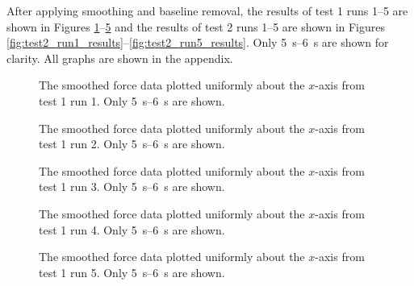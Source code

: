 \documentclass[12 pt]{report}
\begin{document}
After applying smoothing and baseline removal, the results of test \num{1} runs \numrange{1}{5} are shown in Figures \ref{fig:test1_run1_results}--\ref{fig:test1_run5_results} and the results of test \num{2} runs \numrange{1}{5} are shown in Figures \ref{fig:test2_run1_results}--\ref{fig:test2_run5_results}. Only \qtyrange{5}{6}{\second} are shown for clarity. All graphs are shown in the appendix.

\begin{figure}[htbp]
	\centering
	
	\caption{The smoothed force data plotted uniformly about the $x$-axis from test \num{1} run \num{1}. Only \qtyrange{5}{6}{\second} are shown.}
	\label{fig:test1_run1_results}
\end{figure}

\begin{figure}[htbp]
	\centering
	
	\caption{The smoothed force data plotted uniformly about the $x$-axis from test \num{1} run \num{2}. Only \qtyrange{5}{6}{\second} are shown.}
	\label{fig:test1_run2_results}
\end{figure}

\begin{figure}[htbp]
	\centering
	
	\caption{The smoothed force data plotted uniformly about the $x$-axis from test \num{1} run \num{3}. Only \qtyrange{5}{6}{\second} are shown.}
	\label{fig:test1_run3_results}
\end{figure}

\begin{figure}[htbp]
	\centering
	
	\caption{The smoothed force data plotted uniformly about the $x$-axis from test \num{1} run \num{4}. Only \qtyrange{5}{6}{\second} are shown.}
	\label{fig:test1_run4_results}
\end{figure}

\begin{figure}[htbp]
	\centering
	
	\caption{The smoothed force data plotted uniformly about the $x$-axis from test \num{1} run \num{5}. Only \qtyrange{5}{6}{\second} are shown.}
	\label{fig:test1_run5_results}
\end{figure}
\end{document}
